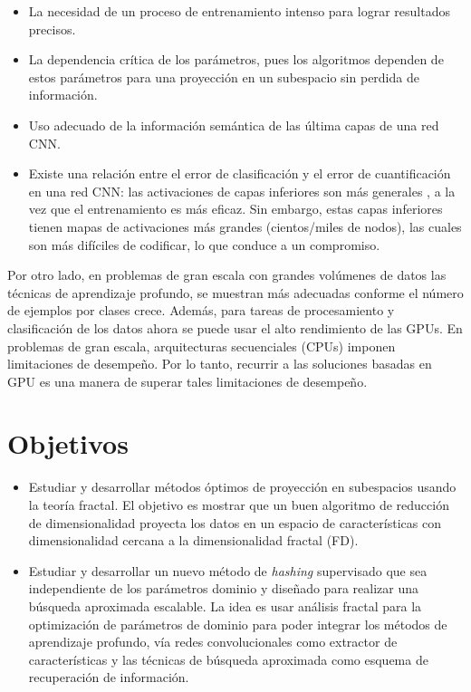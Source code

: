 \begin{itemize}
  \item La necesidad de un proceso de entrenamiento intenso para lograr resultados precisos.

  \item  La dependencia crítica de los parámetros, pues los algoritmos dependen de  estos parámetros  para una proyección en un subespacio sin perdida de información.

  \item  Uso adecuado de la informaci\'on sem\'antica de las  última capas de una red CNN.

  \item  Existe una relación entre el error de clasificación y el error de cuantificación en una red CNN: las activaciones de capas inferiores son más generales \cite{DBLP:journals/corr/YosinskiCBL14}, a la vez que el entrenamiento es más eficaz. Sin embargo, estas capas inferiores tienen mapas de activaciones más grandes (cientos/miles de  nodos), las cuales son más difíciles de codificar, lo que conduce a un compromiso.
 
\end{itemize}

Por otro lado, en problemas de gran escala con grandes volúmenes de datos las técnicas de aprendizaje profundo,  se muestran más adecuadas conforme el número de ejemplos por clases crece. Además, para tareas de procesamiento y clasificación de los datos  ahora se puede usar el alto rendimiento de las GPUs.   En problemas de gran escala, arquitecturas secuenciales (CPUs) imponen limitaciones de desempeño. Por lo tanto, recurrir a las soluciones basadas en GPU es una manera de superar tales limitaciones de desempeño.
 

\section{Objetivos}\label{objs}


\begin{itemize}
  \item  Estudiar y desarrollar  m\'etodos óptimos de proyección  en subespacios usando la teoría fractal.  El objetivo es   mostrar que un buen algoritmo de reducción de dimensionalidad  proyecta los datos en un espacio de características con dimensionalidad cercana a la dimensionalidad fractal (FD).

  \item  Estudiar y desarrollar un nuevo m\'etodo de \textit{hashing} supervisado que sea independiente de los parámetros dominio y  diseñado para realizar una búsqueda  aproximada escalable.    La idea es usar análisis fractal para la optimización de parámetros de dominio para poder integrar los métodos de aprendizaje profundo, vía redes convolucionales como extractor de características y las técnicas de búsqueda aproximada como esquema de recuperación de información.
\end{itemize}
 

